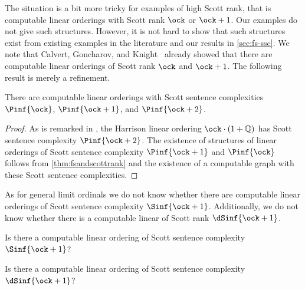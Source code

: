 \documentclass{amsart}
\newcommand{\Q}{\mathbb{Q}}
\begin{document}
The situation is a bit more tricky for examples of high Scott rank, that is
computable linear orderings with Scott rank $\ock$ or $\ock+1$. Our examples do
not give such structures. However, it is not hard to show that such structures
exist from existing examples in the literature and our results in
\cref{sec:fs-ssc}. We note that Calvert, Goncharov, and
Knight~\cite{calvert2007} already showed that there are computable linear
orderings of Scott rank $\ock$ and $\ock+1$. The following result is merely a
refinement.
\begin{theorem}\label{thm:highScottrank}
    There are computable linear orderings with Scott sentence complexities
    $\Pinf{\ock}$, $\Pinf{\ock+1}$, and $\Pinf{\ock+2}$.
\end{theorem}
\begin{proof}
    As is remarked in \cite{alvir2021}, the Harrison linear ordering $\ock\cdot (1+\Q)$ has Scott sentence
    complexity $\Pinf{\ock+2}$. The existence of structures of linear orderings
    of Scott sentence complexity $\Pinf{\ock+1}$ and $\Pinf{\ock}$ follows from
    \cref{thm:fsandscottrank} and the existence of a computable graph with these Scott
    sentence complexities.
\end{proof}
As for general limit ordinals we do not know whether there are computable linear orderings
of Scott sentence complexity $\Sinf{\ock+1}$. Additionally, we do not know
whether there is a computable linear of Scott rank $\dSinf{\ock+1}$.

\begin{question}\label{ques:highSinf}
    Is there a computable linear ordering of Scott sentence complexity
    $\Sinf{\ock+1}$?
\end{question}
\begin{question}\label{ques:highdSinf}
    Is there a computable linear ordering of Scott sentence complexity
    $\dSinf{\ock+1}$?
\end{question}
 
\printbibliography
\end{document}
